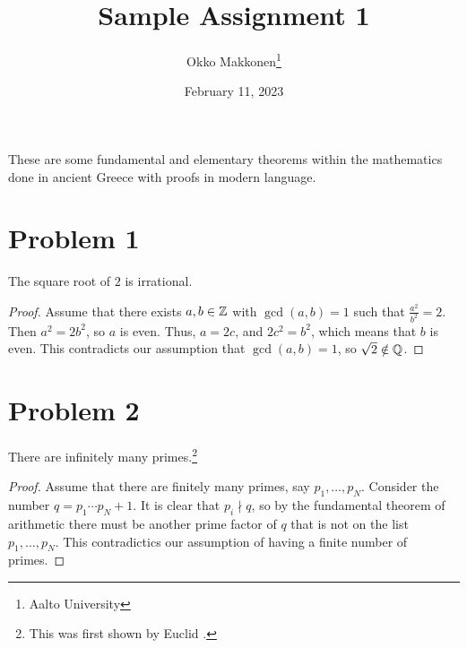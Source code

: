 \documentclass{myassignment}
\title{Sample Assignment 1}
\author{Okko Makkonen\thanks{Aalto University}}
\date{February 11, 2023}
\begin{document}
\maketitle

These are some fundamental and elementary theorems within the mathematics done in ancient Greece with proofs in modern language.
    
\section{Problem 1}

\begin{claim}
The square root of $2$ is irrational.
\end{claim}

\begin{proof}
Assume that there exists $a, b \in \mathbb{Z}$ with $\gcd(a, b) = 1$ such that $\frac{a^2}{b^2} = 2$. Then $a^2 = 2b^2$, so $a$ is even. Thus, $a = 2c$, and $2c^2 = b^2$, which means that $b$ is even. This contradicts our assumption that $\gcd(a, b) = 1$, so $\sqrt{2} \notin \mathbb{Q}$.
\end{proof}

\section{Problem 2}

\begin{claim}
There are infinitely many primes.\footnote{This was first shown by Euclid \cite{euclid400BCE}.}
\end{claim}

\begin{proof}
Assume that there are finitely many primes, say $p_1, \dots, p_N$. Consider the number $q = p_1 \cdots p_N + 1$. It is clear that $p_i \nmid q$, so by the fundamental theorem of arithmetic there must be another prime factor of $q$ that is not on the list $p_1, \dots, p_N$. This contradictics our assumption of having a finite number of primes.
\end{proof}



\end{document}
